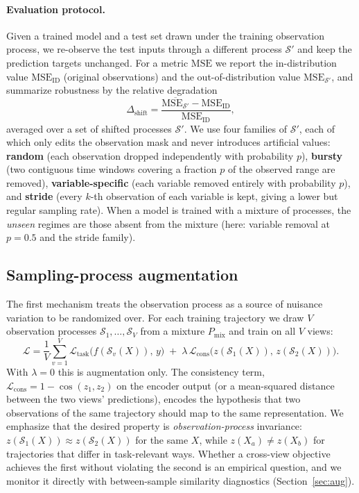 \documentclass[sigconf,nonacm]{acmart}
\begin{document}
\paragraph{Evaluation protocol.}
Given a trained model and a test set drawn under the training observation process, we re-observe the test
inputs through a different process $\mathcal S'$ and keep the prediction targets unchanged. For a metric
$\mathrm{MSE}$ we report the in-distribution value $\mathrm{MSE}_{\mathrm{ID}}$ (original observations) and the
out-of-distribution value $\mathrm{MSE}_{\mathcal S'}$, and summarize robustness by the relative degradation
\begin{equation}
\Delta_{\mathrm{shift}}=\frac{\overline{\mathrm{MSE}_{\mathcal S'}}-\mathrm{MSE}_{\mathrm{ID}}}{\mathrm{MSE}_{\mathrm{ID}}},
\end{equation}
averaged over a set of shifted processes $\mathcal S'$. We use four families of $\mathcal S'$, each of which only
edits the observation mask and never introduces artificial values: \textbf{random} (each observation dropped
independently with probability $p$), \textbf{bursty} (two contiguous time windows covering a fraction $p$ of the
observed range are removed), \textbf{variable-specific} (each variable removed entirely with probability $p$), and
\textbf{stride} (every $k$-th observation of each variable is kept, giving a lower but regular sampling rate).
When a model is trained with a mixture of processes, the \emph{unseen} regimes are those absent from the mixture
(here: variable removal at $p=0.5$ and the stride family).

\subsection{Sampling-process augmentation}
\label{sec:method-aug}
The first mechanism treats the observation process as a source of nuisance variation to be randomized over. For
each training trajectory we draw $V$ observation processes $\mathcal S_1,\dots,\mathcal S_V$ from a mixture
$P_{\mathrm{mix}}$ and train on all $V$ views:
\begin{equation}
\mathcal L=\frac1V\sum_{v=1}^{V}\mathcal L_{\mathrm{task}}\big(f(\mathcal S_v(X)),\,y\big)
\;+\;\lambda\,\mathcal L_{\mathrm{cons}}\big(z(\mathcal S_1(X)),\,z(\mathcal S_2(X))\big).
\label{eq:aug}
\end{equation}
With $\lambda=0$ this is augmentation only. The consistency term, $\mathcal L_{\mathrm{cons}}=1-\cos(z_1,z_2)$ on
the encoder output (or a mean-squared distance between the two views' predictions), encodes the hypothesis that
two observations of the same trajectory should map to the same representation. We emphasize that the desired
property is \emph{observation-process} invariance: $z(\mathcal S_1(X))\approx z(\mathcal S_2(X))$ for the same
$X$, while $z(X_a)\neq z(X_b)$ for trajectories that differ in task-relevant ways. Whether a cross-view objective
achieves the first without violating the second is an empirical question, and we monitor it directly with
between-sample similarity diagnostics (Section~\ref{sec:aug}).
\end{document}
